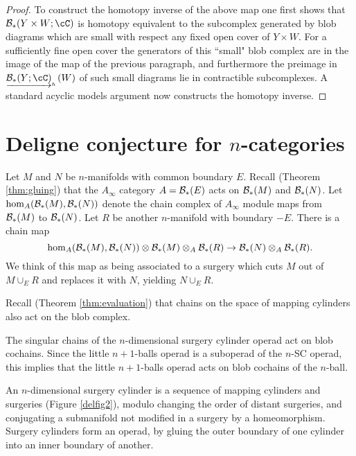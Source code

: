 \documentclass{pnastwo}
\begin{document}
\begin{article}
\begin{proof}
To construct the homotopy inverse of the above map one first shows that
$\bc_*(Y\times W; \cC)$ is homotopy equivalent to the subcomplex generated by blob diagrams which
are small with respect any fixed open cover of $Y\times W$.
For a sufficiently fine open cover the generators of this ``small" blob complex are in the image of the map
of the previous paragraph, and furthermore the preimage in $\clh{\bc_*(Y;\cC)}(W)$ of such small diagrams
lie in contractible subcomplexes.
A standard acyclic models argument now constructs the homotopy inverse.
\end{proof}


\section{Deligne conjecture for $n$-categories}
\label{sec:applications}

Let $M$ and $N$ be $n$-manifolds with common boundary $E$.
Recall (Theorem \ref{thm:gluing}) that the $A_\infty$ category $A = {\mathcal B}_*(E)$
acts on ${\mathcal B}_*(M)$ and ${\mathcal B}_*(N)$.
Let $\hom_A({\mathcal B}_*(M), {\mathcal B}_*(N))$ denote the chain complex of $A_\infty$ module maps
from ${\mathcal B}_*(M)$ to ${\mathcal B}_*(N)$.
Let $R$ be another $n$-manifold with boundary $-E$.
There is a chain map
\[
	\hom_A({\mathcal B}_*(M), {\mathcal B}_*(N)) \otimes {\mathcal B}_*(M) \otimes_A {\mathcal B}_*(R) \to {\mathcal B}_*(N) \otimes_A {\mathcal B}_*(R) .
\]
We think of this map as being associated to a surgery which cuts $M$ out of $M\cup_E R$ and
replaces it with $N$, yielding $N\cup_E R$.

Recall (Theorem \ref{thm:evaluation}) that chains on the space of mapping cylinders also act  on the 
blob complex.


\begin{thm}
\label{thm:deligne}
The singular chains of the $n$-dimensional surgery cylinder operad act on blob cochains.
Since the little $n{+}1$-balls operad is a suboperad of the $n$-SC operad,
this implies that the little $n{+}1$-balls operad acts on blob cochains of the $n$-ball.
\end{thm}

An $n$-dimensional surgery cylinder is a sequence of mapping cylinders and surgeries (Figure \ref{delfig2}), 
modulo changing the order of distant surgeries, and conjugating a submanifold not modified in a surgery by a homeomorphism. 
Surgery cylinders form an operad, by gluing the outer boundary of one cylinder into an inner boundary of another.


\end{article}
\end{document}
